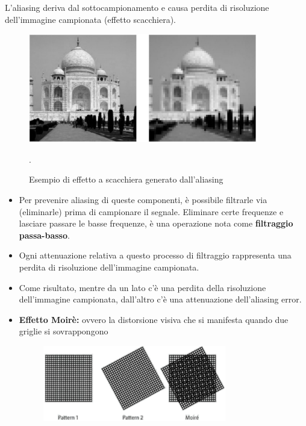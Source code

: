L'aliasing deriva dal sottocampionamento e causa perdita di risoluzione
dell'immagine campionata (effetto scacchiera).

\begin{figure}[H]
    \centering
    \includegraphics[width=10cm, keepaspectratio]{capitoli/immagini/imgs/aliasing_tajmahal.jpg}
    \caption{Esempio di effetto a scacchiera generato dall'aliasing}.
\end{figure}

\begin{itemize}
    \item Per prevenire aliasing di queste componenti, è possibile filtrarle via
          (eliminarle) prima di campionare il segnale. Eliminare certe frequenze
          e lasciare passare le basse frequenze, è una operazione nota come
          \textbf{filtraggio passa-basso}.
    \item Ogni attenuazione relativa a questo processo di filtraggio rappresenta
          una perdita di risoluzione dell'immagine campionata.
    \item Come risultato, mentre da un lato c'è una perdita della risoluzione
          dell'immagine campionata, dall'altro c'è una attenuazione
          dell'aliasing error.
    \item \textbf{Effetto Moirè:} ovvero la distorsione visiva che si manifesta
          quando due griglie si sovrappongono
          \begin{figure}[H]
              \centering
              \includegraphics[width=8cm, keepaspectratio]{capitoli/immagini/imgs/effetto_moire.jpg}
          \end{figure}
\end{itemize}

